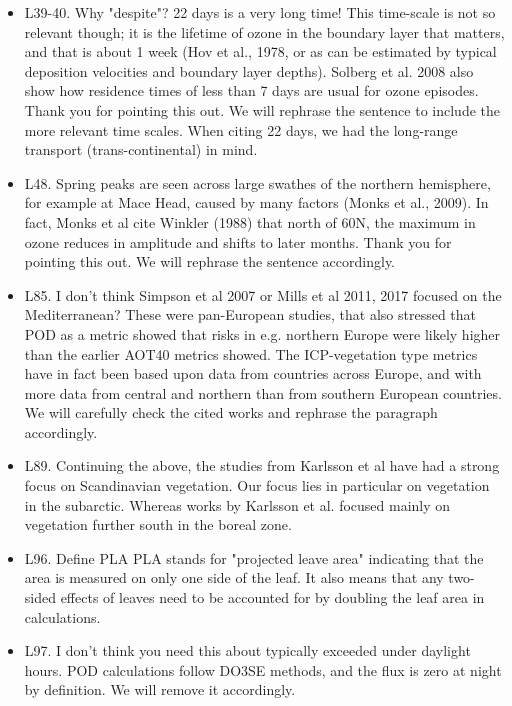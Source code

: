 \documentclass{scrartcl}
\begin{document}
\begin{itemize}
\item {\color{blue}L39-40. Why "despite"? 22 days is a very long time! This time-scale is not so relevant though; it is the lifetime of ozone in the boundary layer that matters, and that is about 1 week (Hov et al., 1978, or as can be estimated by typical deposition velocities and boundary layer depths). Solberg et al. 2008 also show how residence times of less than 7 days are usual for ozone episodes.}
Thank you for pointing this out. We will rephrase the sentence to include the more relevant time scales. When citing 22 days, we had the long-range transport (trans-continental) in mind.

\item {\color{blue}L48. Spring peaks are seen across large swathes of the northern hemisphere, for example at Mace Head, caused by many factors (Monks et al., 2009). In fact, Monks et al cite Winkler (1988) that north of 60N, the maximum in ozone reduces in amplitude and shifts to later months.}
Thank you for pointing this out. We will rephrase the sentence accordingly.

\item {\color{blue}L85. I don't think Simpson et al 2007 or Mills et al 2011, 2017 focused on the Mediterranean? These were pan-European studies, that also stressed that POD as a metric showed that risks in e.g. northern Europe were likely higher than the earlier AOT40 metrics showed. The ICP-vegetation type metrics have in fact been based upon data from countries across Europe, and with more data from central and northern than from southern European countries.}
We will carefully check the cited works and rephrase the paragraph accordingly. 

\item {\color{blue}L89. Continuing the above, the studies from Karlsson et al have had a strong focus on Scandinavian vegetation.}
Our focus lies in particular on vegetation in the subarctic. Whereas works by Karlsson et al. focused mainly on vegetation further south in the boreal zone. 

\item {\color{blue}L96. Define PLA}
PLA stands for "projected leave area" indicating that the area is measured on only one side of the leaf. It also means that any two-sided effects of leaves need to be accounted for by doubling the leaf area in calculations.

\item {\color{blue}L97. I don't think you need this about typically exceeded under daylight hours. POD calculations follow DO3SE methods, and the flux is zero at night by definition.}
We will remove it accordingly.


\end{itemize}
\end{document}
